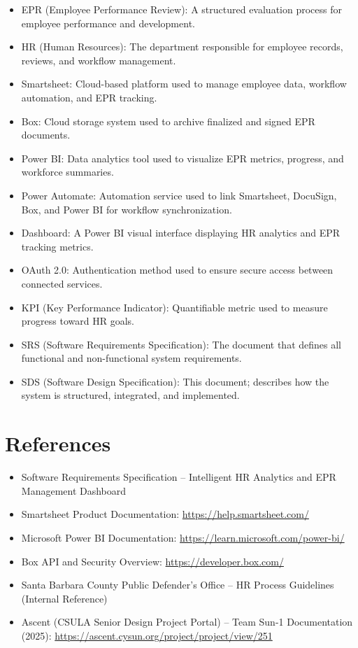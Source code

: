 \documentclass[12pt]{article}
\def\textbf#1{#1}%
\def\&{ and }%
\begin{document}
\begin{itemize}[nosep]
  \item \textbf{EPR (Employee Performance Review):} A structured evaluation process for employee performance and development.  
  \item \textbf{HR (Human Resources):} The department responsible for employee records, reviews, and workflow management.  
  \item \textbf{Smartsheet:} Cloud-based platform used to manage employee data, workflow automation, and EPR tracking.  
  \item \textbf{Box:} Cloud storage system used to archive finalized and signed EPR documents.  
  \item \textbf{Power BI:} Data analytics tool used to visualize EPR metrics, progress, and workforce summaries.  
  \item \textbf{Power Automate:} Automation service used to link Smartsheet, DocuSign, Box, and Power BI for workflow synchronization.  
  \item \textbf{Dashboard:} A Power BI visual interface displaying HR analytics and EPR tracking metrics.  
  \item \textbf{OAuth 2.0:} Authentication method used to ensure secure access between connected services.  
  \item \textbf{KPI (Key Performance Indicator):} Quantifiable metric used to measure progress toward HR goals.  
  \item \textbf{SRS (Software Requirements Specification):} The document that defines all functional and non-functional system requirements.  
  \item \textbf{SDS (Software Design Specification):} This document; describes how the system is structured, integrated, and implemented.  
\end{itemize}

\section{References}

\begin{itemize}[nosep]
  \item Software Requirements Specification – Intelligent HR Analytics \& EPR Management Dashboard  
  \item Smartsheet Product Documentation: \url{https://help.smartsheet.com/}  
  \item Microsoft Power BI Documentation: \url{https://learn.microsoft.com/power-bi/}  
  \item Box API and Security Overview: \url{https://developer.box.com/}  
  \item Santa Barbara County Public Defender’s Office – HR Process Guidelines (Internal Reference)  
  \item Ascent (CSULA Senior Design Project Portal) – Team Sun-1 Documentation (2025): \url{https://ascent.cysun.org/project/project/view/251}
\end{itemize}
\end{document}

